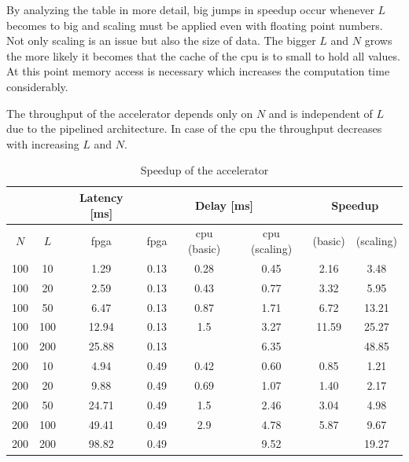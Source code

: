 \documentclass[mscthesis]{usiinfthesis}
\begin{document}
By analyzing the table in more detail, big jumps in speedup occur whenever $L$
becomes to big and scaling must be applied even with floating point numbers.
Not only scaling is an issue but also the size of data. The bigger $L$ and $N$
grows the more likely it becomes that the cache of the \gls{cpu} is to small
to hold all values. At this point memory access is necessary which increases
the computation time considerably.

The throughput of the accelerator depends only on $N$ and is independent of $L$
due to the pipelined architecture. In case of the \gls{cpu} the throughput
decreases with increasing $L$ and $N$.

\begin{table}
    \footnotesize
    \begin{center}
    \begin{tabular}{|c|c|c|c|c|c|c|c|}
        \cline{3-8}
        \multicolumn{2}{c|}{} & Latency [ms]
        & \multicolumn{3}{c|}{Delay [ms]}
        & \multicolumn{2}{c|}{Speedup} \\
        \hline
        $N$ & $L$ & \acrshort{fpga} & \acrshort{fpga}
        & \acrshort{cpu} (basic)
        & \acrshort{cpu} (scaling) & (basic) & (scaling) \\
        \hline
        \hline
        100 & 10  & 1.29  & 0.13 & 0.28 & 0.45 & 2.16  & 3.48  \\
        100 & 20  & 2.59  & 0.13 & 0.43 & 0.77 & 3.32  & 5.95  \\
        100 & 50  & 6.47  & 0.13 & 0.87 & 1.71 & 6.72  & 13.21 \\
        \rowcolor{blue!25}
        100 & 100 & 12.94 & 0.13 & 1.5  & 3.27 & 11.59 & 25.27 \\
        \rowcolor{blue!25}
        100 & 200 & 25.88 & 0.13 &      & 6.35 &       & 48.85 \\
        200 & 10  & 4.94  & 0.49 & 0.42 & 0.60 & 0.85  & 1.21  \\
        200 & 20  & 9.88  & 0.49 & 0.69 & 1.07 & 1.40  & 2.17  \\
        \rowcolor{blue!25}
        200 & 50  & 24.71 & 0.49 & 1.5  & 2.46 & 3.04  & 4.98  \\
        \rowcolor{blue!25}
        200 & 100 & 49.41 & 0.49 & 2.9  & 4.78 & 5.87  & 9.67  \\
        \rowcolor{blue!25}
        200 & 200 & 98.82 & 0.49 &      & 9.52 &       & 19.27 \\
        \hline
    \end{tabular}
    \end{center}
    \caption{Speedup of the accelerator}
    \label{tab:res_speed}
\end{table}
\end{document}

